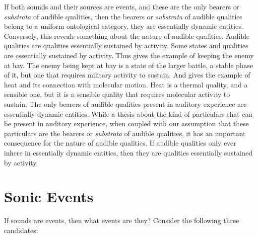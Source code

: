 \documentclass[12pt]{article}
\begin{document}
If both sounds and their sources are events, and these are the only bearers or \emph{substrata} of audible qualities, then the bearers or \emph{substrata} of audible qualities belong to a uniform ontological category, they are essentially dynamic entities. Conversely, this reveals something about the nature of audible qualities. Audible qualities are qualities essentially sustained by activity. Some states and qualities are essentially sustained by activity. Thus \citet{Ryle:1949qr} gives the example of keeping the enemy at bay. The enemy being kept at bay is a state of the larger battle, a stable phase of it, but one that requires military activity to sustain. And \citet{kripke72} gives the example of heat and its connection with molecular motion. Heat is a thermal quality, and a sensible one, but it is a sensible quality that requires molecular activity to sustain. The only bearers of audible qualities present in auditory experience are essentially dynamic entities. While a thesis about the kind of particulars that can be present in auditory experience, when coupled with our assumption that these particulars are the bearers or \emph{substrata} of audible qualities, it has an important consequence for the nature of audible qualities. If audible qualities only ever inhere in essentially dynamic entities, then they are qualities essentially sustained by activity. 


\section{Sonic Events} %
\label{sec:sonic_events}

If sounds are events, then what events are they? Consider the following three candidates:
\end{document}
